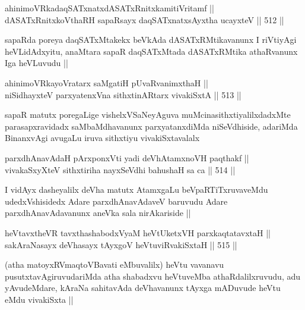 \begin{shl}
ahinimoVRkadaqSATxnatxdASATxRnitxkamitiVritamf ||  \\
dASATxRnitxkoV\s thaRH sapaRsayx daqSATxnatxsAyxtha ucayxteV ||  512 ||  
\end{shl}

\begin{artha}
sapaRda poreya daqSATxMtakekx beVkAda dASATxRMtikavanunx I riVtiyAgi
heVLidAdxyitu, anaMtara sapaR daqSATxMtada dASATxRMtika athaRvanunx
Iga heVLuvudu ||
\end{artha}


\begin{shl}
ahinimoVRkayoVratarx saMgatiH pUvaRvanimxthaH || \\
niSidhayxteV parxyatenxVna sithxtinARtarx vivakiSxtA ||  513 ||  
\end{shl}

\begin{artha}
sapaR matutx poregaLige vishelxVSaNeyAguva muMcinasithxtiyalilxdadxMte
parasapxravidadx saMbaMdhavanunx parxyatanxdiMda niSeVdhiside,
adariMda BinanxvAgi avugaLu iruva sithxtiyu vivakiSxtavalalx 
\end{artha}

\begin{shl}
parxdhAnavAdaH pArxponxVti yadi deVhAtamxnoVH paqthakf || \\
vivakaSxyXteV sithxtiriha nayxSeVdhi bahushaH sa ca ||  514 ||  
\end{shl}

\begin{artha}
I vidAyx dasheyalilx deVha matutx AtamxgaLu beVpaRTiTxruvaveMdu
udedxVshisidedx Adare parxdhAnavAdaveV baruvudu Adare
parxdhAnavAdavanunx aneVka sala nirAkariside ||
\end{artha}


\begin{shl}
heVtavxtheVR tavxthashabodxV\s yaM heVtUketxVH parxkaqtatavxtaH || \\
sakAraNasayx deVhasayx tAyxgoV heVtuviRvakiSxtaH ||  515 ||  
\end{shl}

\begin{artha}
(atha matoyxRV\s maqtoVBavati eMbuvalilx) heVtu vavanavu
  pusutxtavAgiruvudariMda atha shabadxvu heVtuveMba athaRdalilxruvudu,
  adu yAvudeMdare, kAraNa sahitavAda deVhavanunx tAyxga mADuvude heVtu
  eMdu vivakiSxta ||
\end{artha}

